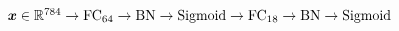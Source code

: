 $\vect{x} \in \real^{784} \newline
	\rightarrow \text{FC}_{64} \rightarrow \text{BN} \rightarrow \text{Sigmoid} \newline
	\rightarrow \text{FC}_{18} \rightarrow \text{BN} \rightarrow \text{Sigmoid}$